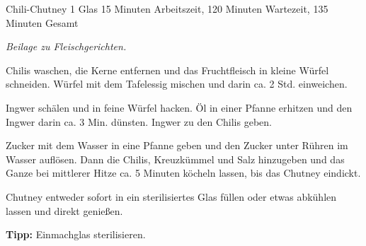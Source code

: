 \begin{recipe}{Chili-Chutney} {1 Glas} {15 Minuten Arbeitszeit, 120 Minuten Wartezeit, 135 Minuten Gesamt}

  \freeform
  \textit{Beilage zu Fleischgerichten.}


  Chilis waschen, die Kerne entfernen und das Fruchtfleisch in kleine Würfel schneiden.
  Würfel mit dem Tafelessig mischen und darin ca. 2 Std. einweichen.

  \newstep
  Ingwer schälen und in feine Würfel hacken.
  Öl in einer Pfanne erhitzen und den Ingwer darin ca. 3 Min. dünsten.
  Ingwer zu den Chilis geben.

  \newstep
  Zucker mit dem Wasser in eine Pfanne geben und den Zucker unter Rühren im Wasser auflösen.
  Dann die Chilis, Kreuzkümmel und Salz hinzugeben und das Ganze bei mittlerer Hitze ca. 5 Minuten köcheln lassen, bis das Chutney eindickt.

  \newstep
  Chutney entweder sofort in ein sterilisiertes Glas füllen oder etwas abkühlen lassen und direkt genießen.

  \freeform
  \hrulefill

  \freeform
  \textbf{Tipp:}
  Einmachglas sterilisieren.

  \end{recipe}
